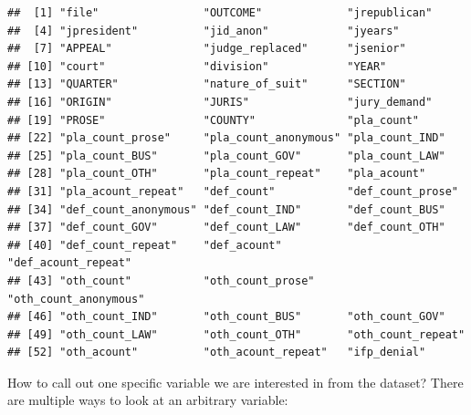 \documentclass[
]{article}
\newenvironment{Shaded}{\begin{snugshade}}{\end{snugshade}}
\newcommand{\DecValTok}[1]{\textcolor[rgb]{0.00,0.00,0.81}{#1}}
\newcommand{\DocumentationTok}[1]{\textcolor[rgb]{0.56,0.35,0.01}{\textbf{\textit{#1}}}}
\newcommand{\FunctionTok}[1]{\textcolor[rgb]{0.00,0.00,0.00}{#1}}
\newcommand{\NormalTok}[1]{#1}
\newcommand{\SpecialCharTok}[1]{\textcolor[rgb]{0.00,0.00,0.00}{#1}}
\newcommand{\StringTok}[1]{\textcolor[rgb]{0.31,0.60,0.02}{#1}}
\begin{document}
\begin{verbatim}
##  [1] "file"                "OUTCOME"             "jrepublican"        
##  [4] "jpresident"          "jid_anon"            "jyears"             
##  [7] "APPEAL"              "judge_replaced"      "jsenior"            
## [10] "court"               "division"            "YEAR"               
## [13] "QUARTER"             "nature_of_suit"      "SECTION"            
## [16] "ORIGIN"              "JURIS"               "jury_demand"        
## [19] "PROSE"               "COUNTY"              "pla_count"          
## [22] "pla_count_prose"     "pla_count_anonymous" "pla_count_IND"      
## [25] "pla_count_BUS"       "pla_count_GOV"       "pla_count_LAW"      
## [28] "pla_count_OTH"       "pla_count_repeat"    "pla_acount"         
## [31] "pla_acount_repeat"   "def_count"           "def_count_prose"    
## [34] "def_count_anonymous" "def_count_IND"       "def_count_BUS"      
## [37] "def_count_GOV"       "def_count_LAW"       "def_count_OTH"      
## [40] "def_count_repeat"    "def_acount"          "def_acount_repeat"  
## [43] "oth_count"           "oth_count_prose"     "oth_count_anonymous"
## [46] "oth_count_IND"       "oth_count_BUS"       "oth_count_GOV"      
## [49] "oth_count_LAW"       "oth_count_OTH"       "oth_count_repeat"   
## [52] "oth_acount"          "oth_acount_repeat"   "ifp_denial"
\end{verbatim}

How to call out one specific variable we are interested in from the
dataset? There are multiple ways to look at an arbitrary variable:

\begin{Shaded}
\end{Shaded}

\begin{Shaded}
\end{Shaded}
\end{document}
